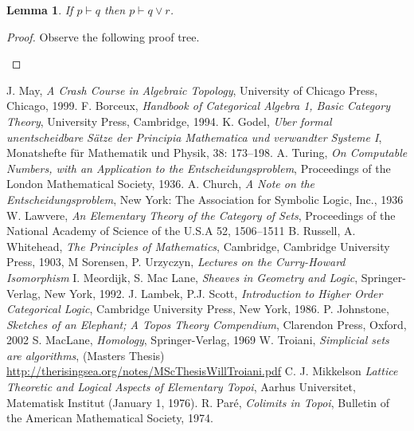 \documentclass{birkjour}
\theoremstyle{plain}
\newtheorem{lemma}[thm]{Lemma}
\theoremstyle{definition}
\begin{document}
	\begin{lemma}\label{lem:disjunction_right}
		If $p \vdash q$ then $p \vdash q \vee r$.
	\end{lemma}
	\begin{proof}
		Observe the following proof tree.
		\begin{prooftree}
			\RightLabel{\eqref{rule:disjunction}}
			\RightLabel{\eqref{rule:cut}}
		\end{prooftree}
	\end{proof}
	\begin{thebibliography}{99}
	 J. May, \emph{A Crash Course in Algebraic Topology}, University of Chicago Press, Chicago, 1999.
	 F. Borceux, \emph{Handbook of Categorical Algebra 1, Basic Category Theory}, University Press, Cambridge, 1994.
	 K. Godel, \emph{Uber formal unentscheidbare Sätze der Principia Mathematica und verwandter Systeme I}, Monatshefte für Mathematik und Physik, 38: 173–198.
	 A. Turing, \emph{On Computable Numbers, with an Application to the Entscheidungsproblem}, Proceedings of the London Mathematical Society, 1936.
	 A. Church, \emph{A Note on the Entscheidungsproblem}, New York: The Association for Symbolic Logic, Inc., 1936
	 W. Lawvere, \emph{An Elementary Theory of the Category of Sets}, Proceedings of
	the National Academy of Science of the U.S.A 52, 1506–1511
	 B. Russell, A. Whitehead, \emph{The Principles of Mathematics}, Cambridge, Cambridge University Press, 1903,
	 M Sorensen, P. Urzyczyn, \emph{Lectures on the Curry-Howard Isomorphism}
	 I. Meordijk, S. Mac Lane, \emph{Sheaves in Geometry and Logic}, Springer-Verlag, New York, 1992.
	 J. Lambek, P.J. Scott, \emph{Introduction to Higher Order Categorical Logic}, Cambridge University Press, New York, 1986.
	 P. Johnstone, \emph{Sketches of an Elephant; A Topos Theory Compendium}, Clarendon Press, Oxford, 2002
	 S. MacLane, \emph{Homology}, Springer-Verlag, 1969
	 W. Troiani, \emph{Simplicial sets are algorithms}, (Masters Thesis) \url{http://therisingsea.org/notes/MScThesisWillTroiani.pdf}
	 C. J. Mikkelson \emph{Lattice Theoretic and Logical Aspects of Elementary Topoi}, Aarhus Universitet, Matematisk Institut (January 1, 1976).
	 R. Paré, \emph{Colimits in Topoi}, Bulletin of the American Mathematical Society, 1974.
	
	\end{thebibliography}
\end{document}
